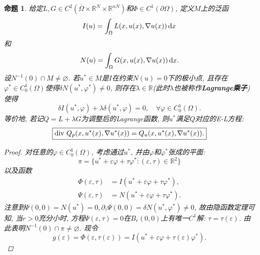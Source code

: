 \documentclass[12pt,a4paper]{article}
\newtheorem{proposition}[theorem]{命题}
\begin{document}
\begin{proposition}\label{prop1.60}
    给定$L, G \in C^2(\overline{\Omega} \times \mathbb{R}^N \times \mathbb{R}^{nN})$和$ \Phi \in C^1(\partial\Omega)$, 定义$M$上的泛函 
    \begin{equation*}
        I(u) = \int_{\Omega}L(x, u(x), \nabla u(x)) \,{\rm d}x 
    \end{equation*}
    和 
    \begin{equation*}
        N(u) = \int_{\Omega}G(x, u(x), \nabla u(x)) \,{\rm d}x. 
    \end{equation*}
    设$N^{-1}(0) \cap M \neq \varnothing$. 若$u^* \in M$是$I$在约束$N(u) = 0$下的极小点, 且存在$\varphi^* \in C_0^1(\Omega)$使得$\delta N(u^*, \varphi^*) \neq 0$, 则存在$\lambda \in \mathbb{R}$(此时$\lambda$也被称作\textbf{Lagrange乘子})使得
    \begin{equation*}
        \delta I(u^*, \varphi) + \lambda\delta(u^*, \varphi) = 0, \quad \forall \varphi \in C_0^1(\Omega).
    \end{equation*}
    等价地, 若记$Q = L + \lambda G$为调整后的Lagrange函数, 则$u^*$满足$Q$对应的E-L方程:
    \begin{equation*}
        \boxed{{\rm div}\ Q_p(x, u^*(x), \nabla u^*(x)) = Q_u(x, u^*(x), \nabla u^*(x)).}
    \end{equation*}
    \begin{proof}
        对任意的$\varphi \in C_0^1(\Omega)$, 考虑通过$u^*$, 并由$\varphi$和$\varphi^*$张成的平面:
        \begin{equation*}
            \pi = \{u^* + \varepsilon\varphi + \tau\varphi^*\colon (\varepsilon, \tau) \in \mathbb{R}^2\}
        \end{equation*}
        以及函数 
        \begin{align*}
            \Phi(\varepsilon, \tau) &= I(u^* + \varepsilon\varphi + \tau\varphi^*), \\   
            \Psi(\varepsilon, \tau) &= N(u^* + \varepsilon\varphi + \tau\varphi^*). 
        \end{align*}
        注意到$\Psi(0, 0) = N(u^*) = 0, \partial_{\tau}\Psi(0, 0) = \delta N(u^*, \varphi^*) \neq 0$, 故由隐函数定理可知, 当$r > 0$充分小时, 方程$\Psi(\varepsilon, \tau) = 0$在$B_r(0, 0)$上有唯一$C^1$解: $\tau = \tau(\varepsilon)$.
        由此表明$N^{-1}(0) \cap \pi \neq \varnothing$. 现令 
        \begin{equation*}
            g(\varepsilon) = \Phi(\varepsilon, \tau(\varepsilon)) = I(u^* + \varepsilon\varphi + \tau(\varepsilon)\varphi^*).
        \end{equation*}

\end{proof}
\end{proposition}
\end{document}
